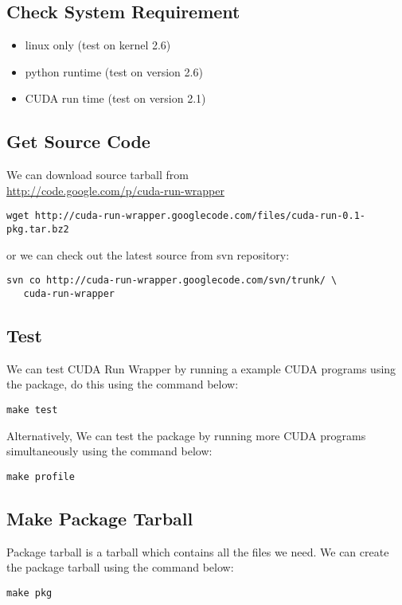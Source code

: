 \documentclass[a4paper,11pt]{article}
\begin{document}
\subsection{Check System Requirement}
\begin{itemize}
  \item linux only (test on kernel 2.6)
  \item python runtime (test on version 2.6)
  \item CUDA run time (test on version 2.1)
\end{itemize}

\subsection{Get Source Code}
We can download source tarball from \\
\href{http://code.google.com/p/cuda-run-wrapper"}{http://code.google.com/p/cuda-run-wrapper}
\begin{Verbatim}[frame=single]
wget http://cuda-run-wrapper.googlecode.com/files/cuda-run-0.1-pkg.tar.bz2
\end{Verbatim}
or we can check out the latest source from svn repository:
\begin{Verbatim}[frame=single]
svn co http://cuda-run-wrapper.googlecode.com/svn/trunk/ \
   cuda-run-wrapper
\end{Verbatim}

\subsection{Test}
We can test CUDA Run Wrapper by  running a example CUDA programs  using the package,
do this using the command below:
\begin{Verbatim}[frame=single]
make test
\end{Verbatim}
Alternatively, We can test the package by running more CUDA programs simultaneously using the command below:
\begin{Verbatim}[frame=single]
make profile
\end{Verbatim}

\subsection{Make Package Tarball}
Package tarball is a tarball which contains all the files we need. 
We can create the package tarball using the command below:
\begin{Verbatim}[frame=single]
make pkg
\end{Verbatim}
\end{document}
